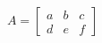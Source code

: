 \documentclass[preview]{standalone}
\begin{document}
\begin{align*}
A = \begin{bmatrix} a & b & c \\ d & e & f \end{bmatrix}
\end{align*}
\end{document}
